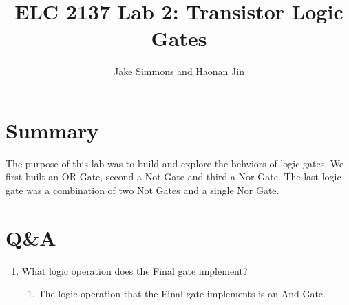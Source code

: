\documentclass[11pt]{article}
\begin{document}
\title{ELC 2137 Lab 2: Transistor Logic Gates}
\author{Jake Simmons and Haonan Jin}
\maketitle

\section*{Summary}

The purpose of this lab was to build and explore the behviors of logic gates. We first built an OR Gate, second a Not Gate and third a Nor Gate. The last logic gate was a combination of two Not Gates and a single Nor Gate.      


\section*{Q\&A}

\begin{enumerate}
	\item What logic operation does the Final gate implement?
		\begin{enumerate}
			\item The logic operation that the Final gate implements is an And Gate.
		\end{enumerate}
\end{enumerate}
\end{document}
